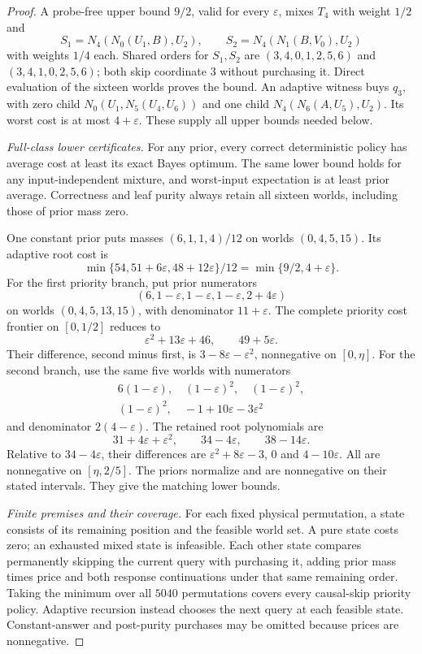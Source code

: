 \begin{proof}
A probe-free upper bound $9/2$, valid for every $\varepsilon$, mixes $T_4$ with weight $1/2$ and
\[
 S_1=N_4(N_0(U_1,B),U_2),\qquad
 S_2=N_4(N_1(B,V_0),U_2)
\]
with weights $1/4$ each. Shared orders for $S_1,S_2$ are $(3,4,0,1,2,5,6)$ and $(3,4,1,0,2,5,6)$; both skip coordinate $3$ without purchasing it. Direct evaluation of the sixteen worlds proves the bound. An adaptive witness buys $q_3$, with zero child $N_0(U_1,N_5(U_4,U_6))$ and one child $N_4(N_6(A,U_5),U_2)$. Its worst cost is at most $4+\varepsilon$. These supply all upper bounds needed below.

\emph{Full-class lower certificates.} For any prior, every correct deterministic policy has average cost at least its exact Bayes optimum. The same lower bound holds for any input-independent mixture, and worst-input expectation is at least prior average. Correctness and leaf purity always retain all sixteen worlds, including those of prior mass zero.

One constant prior puts masses $(6,1,1,4)/12$ on worlds $(0,4,5,15)$. Its adaptive root cost is
\[
 \min\{54,51+6\varepsilon,48+12\varepsilon\}/12
 =\min\{9/2,4+\varepsilon\}.
\]
For the first priority branch, put prior numerators
\[
 (6,1-\varepsilon,1-\varepsilon,1-\varepsilon,2+4\varepsilon)
\]
on worlds $(0,4,5,13,15)$, with denominator $11+\varepsilon$. The complete priority cost frontier on $[0,1/2]$ reduces to
\[
 \varepsilon^2+13\varepsilon+46,\qquad49+5\varepsilon.
\]
Their difference, second minus first, is $3-8\varepsilon-\varepsilon^2$, nonnegative on $[0,\eta]$.
For the second branch, use the same five worlds with numerators
\[
 \begin{gathered}
 6(1-\varepsilon),\quad(1-\varepsilon)^2,\quad(1-\varepsilon)^2,\\
 (1-\varepsilon)^2,\quad-1+10\varepsilon-3\varepsilon^2
 \end{gathered}
\]
and denominator $2(4-\varepsilon)$. The retained root polynomials are
\[
 31+4\varepsilon+\varepsilon^2,\qquad34-4\varepsilon,
 \qquad38-14\varepsilon.
\]
Relative to $34-4\varepsilon$, their differences are $\varepsilon^2+8\varepsilon-3$, $0$ and $4-10\varepsilon$. All are nonnegative on $[\eta,2/5]$. The priors normalize and are nonnegative on their stated intervals. They give the matching lower bounds.

\emph{Finite premises and their coverage.} For each fixed physical permutation, a state consists of its remaining position and the feasible world set. A pure state costs zero; an exhausted mixed state is infeasible. Each other state compares permanently skipping the current query with purchasing it, adding prior mass times price and both response continuations under that same remaining order. Taking the minimum over all $5040$ permutations covers every causal-skip priority policy. Adaptive recursion instead chooses the next query at each feasible state. Constant-answer and post-purity purchases may be omitted because prices are nonnegative.


\end{proof}
